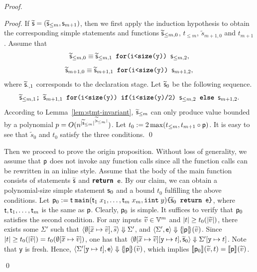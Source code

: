 \documentclass[runningheads]{llncs}
\begin{document}
\begin{proof}
\begin{proof}
    If $\widetilde{\s}=(\widetilde{\s}_{\le m},\s_{m+1})$, then we first apply the induction hypothesis to obtain the corresponding simple statements and functions $\widetilde{\s}_{\le m, 0}$, $t_{\le m}$, $\widetilde{s}_{m+1,0}$ and $t_{m+1}$.
    Assume that
    \begin{equation}
        \widetilde{\s}_{\le m, 0}\equiv\widetilde{\s}_{\le m, 1}\texttt{ \textbf{for}(i<\textbf{size}(y)) }\s_{\le m, 2},
    \end{equation}
    \begin{equation}
        \widetilde{\s}_{m+1, 0}\equiv\widetilde{\s}_{m+1, 1}\texttt{ \textbf{for}(i<\textbf{size}(y)) }\s_{m+1, 2},
    \end{equation}
    where $\widetilde{\s}_{\cdot,1}$ corresponds to the declaration stage.
    Let $\widetilde{\s}_0$ be the following sequence.
    \begin{equation}
        \widetilde{\s}_{\le m, 1}\texttt{; }\widetilde{\s}_{m+1, 1}\texttt{ \textbf{for}(i<\textbf{size}(y)) \textbf{if}(i<\textbf{size}(y)/2) $\s_{\le m,2}$ \textbf{else} $\s_{m+1,2}$}.
    \end{equation}
    According to Lemma~\ref{lem:stmt-invariant}, $\widetilde{\s}_{\le m}$ can only produce value bounded by a polynomial $p=O(n^{\size{\widetilde{\s}_{\le m}}^{\size{\widetilde{\s}_{\le m}}}})$.
    Let $t_0:=2\max(t_{\le m}, t_{m+1} \circ \p)$.
    It is easy to see that $\widetilde{s}_0$ and $t_0$ satisfy the three conditions.
    \qed
\end{proof}

Then we proceed to prove the origin proposition.
Without loss of generality, we assume that $\p$ does not invoke any function calls since all the function calls can be rewritten in an inline style.
Assume that the body of the main function consists of statements $\widetilde{\s}$ and \texttt{\textbf{return} $\e$}.
By our claim, we can obtain a polynomial-size simple statement $\s_0$ and a bound $t_0$ fulfilling the above conditions.
Let $\p_0:=\tt\;\texttt{main}(\tt_1\;x_1,\dots,\tt_m\;x_m,\texttt{iint}\;y)\texttt{\{$\widetilde{\s}_0$ \textbf{return} $\e$\}}$, where $\tt,\tt_1,\dots,\tt_m$ is the same as $\p$.
Clearly, $\p_0$ is simple.
It suffices to verify that $\p_0$ satisfies the second condition.
For any inputs $\widetilde{v}\in \V^m$ and $|t|\ge t_0(\size{\widetilde{v}})$, 
there exists some $\Sigma'$ such that $\semantics{\emptyset[\widetilde{x}\mapsto\widetilde{v}]}{\widetilde{s}}{\Sigma'}$, and $\semantics{\Sigma'}{\e}{\tmap{\p}{}(\widetilde{v})}$.
Since $|t|\ge t_0(\size{\widetilde{v}})=t_0(\emptyset[\widetilde{x}\mapsto\widetilde{v}])$, one has that $\semantics{\emptyset[\widetilde{x}\mapsto\widetilde{v}][\texttt{y}\mapsto t]}{\widetilde{\s}_0}{\Sigma'[\texttt{y}\mapsto t]}$.
Note that \texttt{y} is fresh.
Hence, $\semantics{\Sigma'[\texttt{y}\mapsto t]}{\e}{\tmap{\p}{}(\widetilde{v})}$, which implies $\smap{\p_0}{}(\widetilde{v},t)=\smap{\p}{}(\widetilde{v})$.

\qed
\end{proof}%
\end{document}
